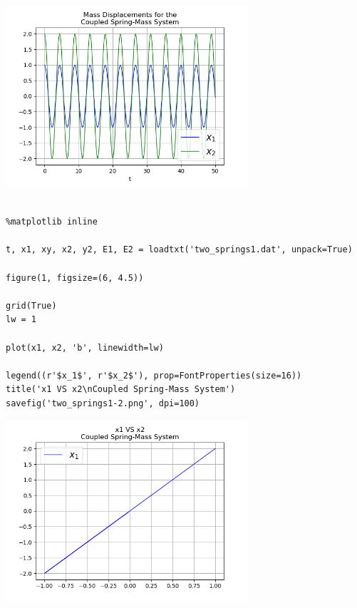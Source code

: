 \documentclass{article} %
\begin{document}
\begin{center}
 	\includegraphics[width=9cm]{two_springs1-1.png}
 \end{center}





\begin{verbatim} 

%matplotlib inline

t, x1, xy, x2, y2, E1, E2 = loadtxt('two_springs1.dat', unpack=True)

figure(1, figsize=(6, 4.5))

grid(True)
lw = 1

plot(x1, x2, 'b', linewidth=lw)

legend((r'$x_1$', r'$x_2$'), prop=FontProperties(size=16))
title('x1 VS x2\nCoupled Spring-Mass System')
savefig('two_springs1-2.png', dpi=100)

\end{verbatim}


\begin{center}
 	\includegraphics[width=9cm]{two_springs1-2.png}
 \end{center}
\end{document}
